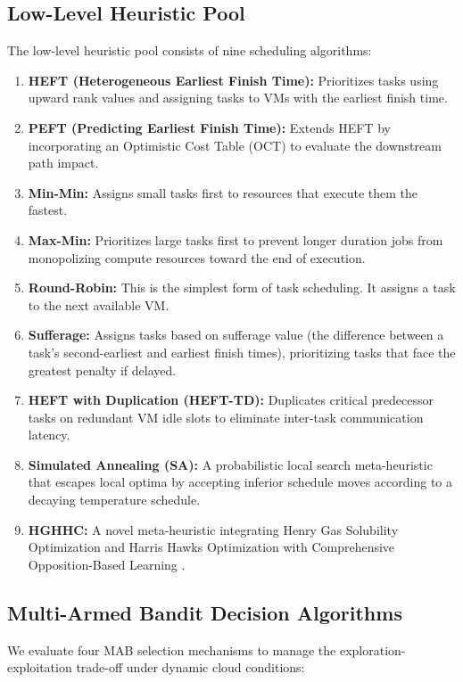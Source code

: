 \subsection{Low-Level Heuristic Pool}
The low-level heuristic pool consists of nine scheduling algorithms:
\begin{enumerate}
    \item \textbf{HEFT (Heterogeneous Earliest Finish Time):} Prioritizes tasks using upward rank values and assigning tasks to VMs with the earliest finish time.
    \item \textbf{PEFT (Predicting Earliest Finish Time):} Extends HEFT by incorporating an Optimistic Cost Table (OCT) to evaluate the downstream path impact.
    \item \textbf{Min-Min:} Assigns small tasks first to resources that execute them the fastest.
    \item \textbf{Max-Min:} Prioritizes large tasks first to prevent longer duration jobs from monopolizing compute resources toward the end of execution.
    \item \textbf{Round-Robin:} This is the simplest form of task scheduling. It assigns a task to the next available VM.
    \item \textbf{Sufferage:} Assigns tasks based on sufferage value (the difference between a task's second-earliest and earliest finish times), prioritizing tasks that face the greatest penalty if delayed.
    \item \textbf{HEFT with Duplication (HEFT-TD):} Duplicates critical predecessor tasks on redundant VM idle slots to eliminate inter-task communication latency.
    \item \textbf{Simulated Annealing (SA):} A probabilistic local search meta-heuristic that escapes local optima by accepting inferior schedule moves according to a decaying temperature schedule.
    \item \textbf{HGHHC:} A novel meta-heuristic integrating Henry Gas Solubility Optimization and Harris Hawks Optimization with Comprehensive Opposition-Based Learning \citep{Alkaam2025Hybrid}.
\end{enumerate}

\subsection{Multi-Armed Bandit Decision Algorithms}
We evaluate four MAB selection mechanisms to manage the exploration-exploitation trade-off under dynamic cloud conditions:

